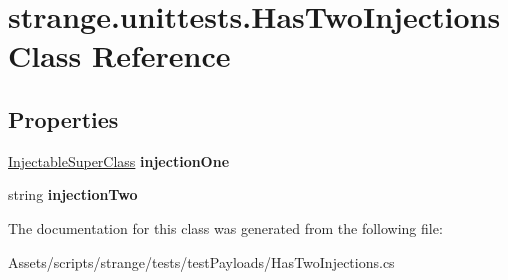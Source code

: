 \hypertarget{classstrange_1_1unittests_1_1_has_two_injections}{\section{strange.\-unittests.\-Has\-Two\-Injections Class Reference}
\label{classstrange_1_1unittests_1_1_has_two_injections}
}
\subsection*{Properties}
\begin{DoxyCompactItemize}
\item 
\hypertarget{classstrange_1_1unittests_1_1_has_two_injections_a4d43486da66e39d8b0795dd3e985c0ec}{\hyperlink{classstrange_1_1unittests_1_1_injectable_super_class}{Injectable\-Super\-Class} {\bfseries injection\-One}}\label{classstrange_1_1unittests_1_1_has_two_injections_a4d43486da66e39d8b0795dd3e985c0ec}

\item 
\hypertarget{classstrange_1_1unittests_1_1_has_two_injections_a395088a3d566a8a00e8cf63a0328cf7e}{string {\bfseries injection\-Two}}\label{classstrange_1_1unittests_1_1_has_two_injections_a395088a3d566a8a00e8cf63a0328cf7e}

\end{DoxyCompactItemize}


The documentation for this class was generated from the following file\-:\begin{DoxyCompactItemize}
\item 
Assets/scripts/strange/tests/test\-Payloads/Has\-Two\-Injections.\-cs\end{DoxyCompactItemize}
